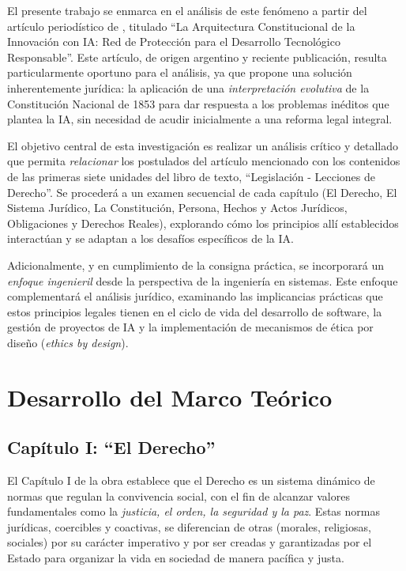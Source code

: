 \documentclass[10pt, a4paper]{article}
\begin{document}
El presente trabajo se enmarca en el análisis de este fenómeno a partir del artículo periodístico de \textcite{articulo_ia}, titulado \enquote{La Arquitectura Constitucional de la Innovación con IA: Red de Protección para el Desarrollo Tecnológico Responsable}. Este artículo, de origen argentino y reciente publicación, resulta particularmente oportuno para el análisis, ya que propone una solución inherentemente jurídica: la aplicación de una \emph{interpretación evolutiva} de la Constitución Nacional de 1853 para dar respuesta a los problemas inéditos que plantea la IA, sin necesidad de acudir inicialmente a una reforma legal integral.

El objetivo central de esta investigación es realizar un análisis crítico y detallado que permita \emph{relacionar} los postulados del artículo mencionado con los contenidos de las primeras siete unidades del libro de texto, \enquote{Legislación - Lecciones de Derecho}. Se procederá a un examen secuencial de cada capítulo (El Derecho, El Sistema Jurídico, La Constitución, Persona, Hechos y Actos Jurídicos, Obligaciones y Derechos Reales), explorando cómo los principios allí establecidos interactúan y se adaptan a los desafíos específicos de la IA.

Adicionalmente, y en cumplimiento de la consigna práctica, se incorporará un \emph{enfoque ingenieril} desde la perspectiva de la ingeniería en sistemas. Este enfoque complementará el análisis jurídico, examinando las implicancias prácticas que estos principios legales tienen en el ciclo de vida del desarrollo de software, la gestión de proyectos de IA y la implementación de mecanismos de ética por diseño (\emph{ethics by design}).

\section{Desarrollo del Marco Teórico}
\label{sec:desarrollo}

\subsection{Capítulo I: ``El Derecho''}
\label{subsec:derecho}

El Capítulo I de la obra \textcite{libro_legislacion} establece que el Derecho es un sistema dinámico de normas que regulan la convivencia social, con el fin de alcanzar valores fundamentales como la \emph{justicia, el orden, la seguridad y la paz}. Estas normas jurídicas, coercibles y coactivas, se diferencian de otras (morales, religiosas, sociales) por su carácter imperativo y por ser creadas y garantizadas por el Estado para organizar la vida en sociedad de manera pacífica y justa.
\end{document}
